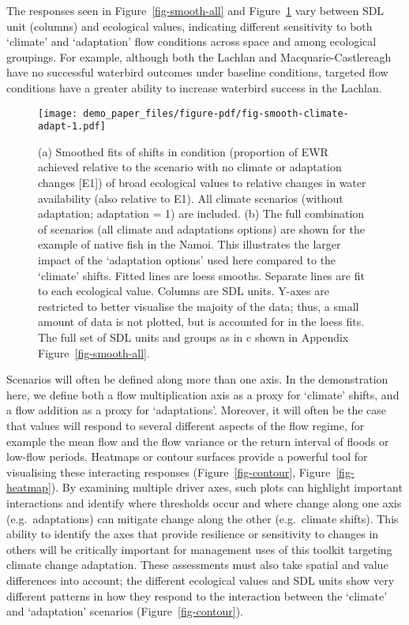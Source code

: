 \documentclass[
  number]{elsarticle}
\begin{document}
The responses seen in Figure~\ref{fig-smooth-all} and
Figure~\ref{fig-smooth-climate-adapt} vary between SDL unit (columns)
and ecological values, indicating different sensitivity to both
`climate' and `adaptation' flow conditions across space and among
ecological groupings. For example, although both the Lachlan and
Macquarie-Castlereagh have no successful waterbird outcomes under
baseline conditions, targeted flow conditions have a greater ability to
increase waterbird success in the Lachlan.

\begin{figure}

{\centering \texttt{[image: demo\_paper\_files/figure-pdf/fig-smooth-climate-adapt-1.pdf]}

}

\caption{\label{fig-smooth-climate-adapt}(a) Smoothed fits of shifts in
condition (proportion of EWR achieved relative to the scenario with no
climate or adaptation changes {[}E1{]}) of broad ecological values to
relative changes in water availability (also relative to E1). All
climate scenarios (without adaptation; adaptation = 1) are included. (b)
The full combination of scenarios (all climate and adaptations options)
are shown for the example of native fish in the Namoi. This illustrates
the larger impact of the `adaptation options' used here compared to the
`climate' shifts. Fitted lines are loess smooths. Separate lines are fit
to each ecological value. Columns are SDL units. Y-axes are restricted
to better visualise the majoity of the data; thus, a small amount of
data is not plotted, but is accounted for in the loess fits. The full
set of SDL units and groups as in c shown in Appendix
Figure~\ref{fig-smooth-all}.}

\end{figure}

Scenarios will often be defined along more than one axis. In the
demonstration here, we define both a flow multiplication axis as a proxy
for `climate' shifts, and a flow addition as a proxy for `adaptations'.
Moreover, it will often be the case that values will respond to several
different aspects of the flow regime, for example the mean flow and the
flow variance or the return interval of floods or low-flow periods.
Heatmaps or contour surfaces provide a powerful tool for visualising
these interacting responses (Figure~\ref{fig-contour},
Figure~\ref{fig-heatmap}). By examining multiple driver axes, such plots
can highlight important interactions and identify where thresholds occur
and where change along one axis (e.g.~adaptations) can mitigate change
along the other (e.g.~climate shifts). This ability to identify the axes
that provide resilience or sensitivity to changes in others will be
critically important for management uses of this toolkit targeting
climate change adaptation. These assessments must also take spatial and
value differences into account; the different ecological values and SDL
units show very different patterns in how they respond to the
interaction between the `climate' and `adaptation' scenarios
(Figure~\ref{fig-contour}).
\end{document}
